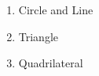 

\begin{enumerate}
    \normalsize \item Circle and Line \par
        \small 
    \normalsize \item Triangle \par
        \small  %
    \normalsize \item Quadrilateral \par
        \small 
\end{enumerate}